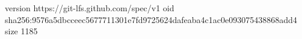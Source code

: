 version https://git-lfs.github.com/spec/v1
oid sha256:9576a5dbcceec5677711301e7fd9725624dafeaba4c1ac0e093075438868add4
size 1185
